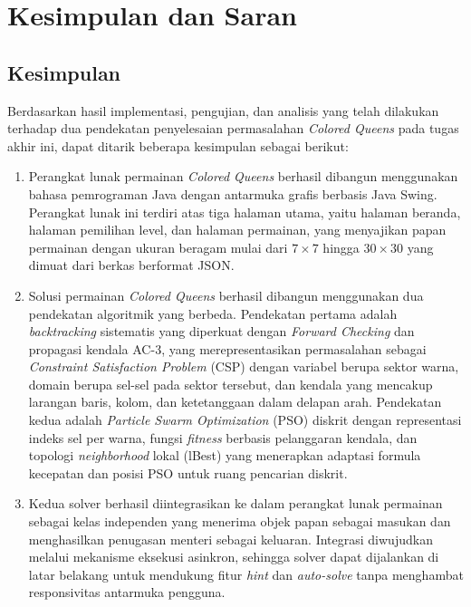 \chapter{Kesimpulan dan Saran}
\label{chap:kesimpulan}

\section{Kesimpulan}
\label{sec:kesimpulan}

Berdasarkan hasil implementasi, pengujian, dan analisis yang telah dilakukan terhadap dua pendekatan penyelesaian permasalahan \textit{Colored Queens} pada tugas akhir ini, dapat ditarik beberapa kesimpulan sebagai berikut:

\begin{enumerate}
	\item Perangkat lunak permainan \textit{Colored Queens} berhasil dibangun menggunakan bahasa pemrograman Java dengan antarmuka grafis berbasis Java Swing. Perangkat lunak ini terdiri atas tiga halaman utama, yaitu halaman beranda, halaman pemilihan level, dan halaman permainan, yang menyajikan papan permainan dengan ukuran beragam mulai dari $7 \times 7$ hingga $30 \times 30$ yang dimuat dari berkas berformat JSON.
	
	\item Solusi permainan \textit{Colored Queens} berhasil dibangun menggunakan dua pendekatan algoritmik yang berbeda. Pendekatan pertama adalah \textit{backtracking} sistematis yang diperkuat dengan \textit{Forward Checking} dan propagasi kendala AC-3, yang merepresentasikan permasalahan sebagai \textit{Constraint Satisfaction Problem} (CSP) dengan variabel berupa sektor warna, domain berupa sel-sel pada sektor tersebut, dan kendala yang mencakup larangan baris, kolom, dan ketetanggaan dalam delapan arah. Pendekatan kedua adalah \textit{Particle Swarm Optimization} (PSO) diskrit dengan representasi indeks sel per warna, fungsi \textit{fitness} berbasis pelanggaran kendala, dan topologi \textit{neighborhood} lokal (lBest) yang menerapkan adaptasi formula kecepatan dan posisi PSO untuk ruang pencarian diskrit.
	
	\item Kedua solver berhasil diintegrasikan ke dalam perangkat lunak permainan sebagai kelas independen yang menerima objek papan sebagai masukan dan menghasilkan penugasan menteri sebagai keluaran. Integrasi diwujudkan melalui mekanisme eksekusi asinkron, sehingga solver dapat dijalankan di latar belakang untuk mendukung fitur \textit{hint} dan \textit{auto-solve} tanpa menghambat responsivitas antarmuka pengguna.
	

\end{enumerate}
